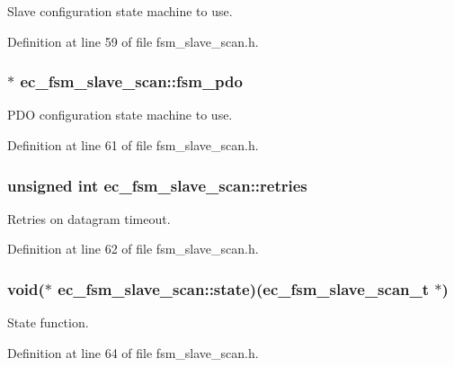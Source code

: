 \-Slave configuration state machine to use. 



\-Definition at line 59 of file fsm\-\_\-slave\-\_\-scan.\-h.

\subsubsection[{fsm\-\_\-pdo}]{$\ast$ {\bf ec\-\_\-fsm\-\_\-slave\-\_\-scan\-::fsm\-\_\-pdo}}\label{structec__fsm__slave__scan_adb7c9afd6972b238a744177aaa869dd7}


\-P\-D\-O configuration state machine to use. 



\-Definition at line 61 of file fsm\-\_\-slave\-\_\-scan.\-h.

\subsubsection[{retries}]{\setlength{\rightskip}{0pt plus 5cm}unsigned int {\bf ec\-\_\-fsm\-\_\-slave\-\_\-scan\-::retries}}\label{structec__fsm__slave__scan_a1abcaa2e075365336e45fa216c2a6ac5}


\-Retries on datagram timeout. 



\-Definition at line 62 of file fsm\-\_\-slave\-\_\-scan.\-h.

\subsubsection[{state}]{\setlength{\rightskip}{0pt plus 5cm}void($\ast$ {\bf ec\-\_\-fsm\-\_\-slave\-\_\-scan\-::state})({\bf ec\-\_\-fsm\-\_\-slave\-\_\-scan\-\_\-t} $\ast$)}\label{structec__fsm__slave__scan_ab3ba7e958f1540f67f21367f96c68c47}


\-State function. 



\-Definition at line 64 of file fsm\-\_\-slave\-\_\-scan.\-h.

